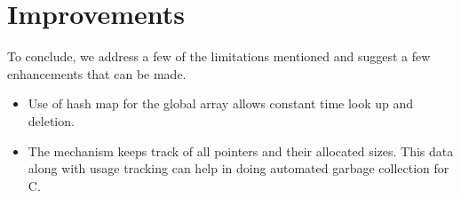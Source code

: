 \documentclass[a4paper, 11pt]{article}
\begin{document}
\section{Improvements}
To conclude, we address a few of the limitations mentioned and suggest a few enhancements that can be made.
\begin{itemize}
\item Use of hash map for the global array allows constant time look up and deletion.
\item The mechanism keeps track of all pointers and their allocated sizes.  This data along with usage tracking can help in doing automated garbage collection for C.
\end{itemize}
\end{document}
